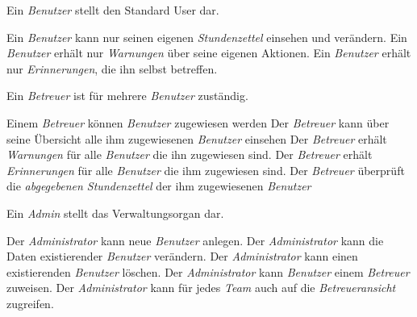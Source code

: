 \begin{requirements}
    Ein \emph{Benutzer} stellt den Standard User dar.
    \begin{requirements}
         Ein \emph{Benutzer} kann nur seinen eigenen \emph{Stundenzettel} einsehen und verändern.
         Ein \emph{Benutzer} erhält nur \emph{Warnungen} über seine eigenen Aktionen.
         Ein \emph{Benutzer} erhält nur \emph{Erinnerungen}, die ihn selbst betreffen.
    \end{requirements}

        Ein \emph{Betreuer} ist für mehrere \emph{Benutzer} zuständig.
        \begin{requirements}
             Einem \emph{Betreuer} können \emph{Benutzer} zugewiesen werden
             Der \emph{Betreuer} kann über seine Übersicht alle ihm zugewiesenen \emph{Benutzer} einsehen
             Der \emph{Betreuer} erhält \emph{Warnungen} für alle \emph{Benutzer} die ihn zugewiesen sind.
             Der \emph{Betreuer} erhält \emph{Erinnerungen} für alle \emph{Benutzer} die ihm zugewiesen sind.
             Der \emph{Betreuer} überprüft die \emph{abgegebenen Stundenzettel} der ihm zugewiesenen \emph{Benutzer}
        \end{requirements}

        Ein \emph{Admin} stellt das Verwaltungsorgan dar.
        \begin{requirements}
             Der \emph{Administrator} kann neue \emph{Benutzer} anlegen.
             Der \emph{Administrator} kann die Daten existierender \emph{Benutzer} verändern.
             Der \emph{Administrator} kann einen existierenden \emph{Benutzer} löschen.
             Der \emph{Administrator} kann \emph{Benutzer} einem \emph{Betreuer} zuweisen.
             Der \emph{Administrator} kann für jedes \emph{Team} auch auf die \emph{Betreueransicht} zugreifen.
        \end{requirements}
\end{requirements}

